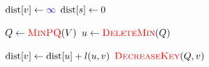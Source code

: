 
\begin{algorithm}[H]
  \begin{algorithmic}
	  \State $\text{dist}[v] \gets \textcolor{blue}{\infty}$
    \EndFor
    \State $\text{dist}[s] \gets 0$

    \Statex
    \State $Q \gets \textcolor{red}{\textsc{MinPQ}}(V)$
	  \State $u \gets \textcolor{red}{\textsc{DeleteMin}}(Q)$

      \hStatex
		  \State $\text{dist}[v] \gets \text{dist}[u] + l(u,v)$
		  \State $\textcolor{red}{\textsc{DecreaseKey}}(Q, v)$
		\EndIf
      \EndFor
    \EndWhile
  \end{algorithmic}
\end{algorithm}
